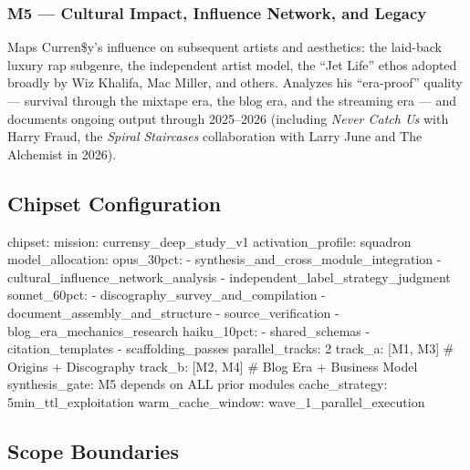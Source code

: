 \documentclass[11pt,letterpaper]{article}
\begin{document}
\subsubsection{M5 — Cultural Impact, Influence Network, and Legacy}
Maps Curren\$y's influence on subsequent artists and aesthetics: the laid-back luxury rap subgenre, the independent artist model, the ``Jet Life'' ethos adopted broadly by Wiz Khalifa, Mac Miller, and others. Analyzes his ``era-proof'' quality — survival through the mixtape era, the blog era, and the streaming era — and documents ongoing output through 2025–2026 (including \textit{Never Catch Us} with Harry Fraud, the \textit{Spiral Staircases} collaboration with Larry June and The Alchemist in 2026).

\subsection{Chipset Configuration}

\begin{center}
\begin{asciibox}
chipset:
  mission: currensy_deep_study_v1
  activation_profile: squadron
  model_allocation:
    opus_30pct:
      - synthesis_and_cross_module_integration
      - cultural_influence_network_analysis
      - independent_label_strategy_judgment
    sonnet_60pct:
      - discography_survey_and_compilation
      - document_assembly_and_structure
      - source_verification
      - blog_era_mechanics_research
    haiku_10pct:
      - shared_schemas
      - citation_templates
      - scaffolding_passes
  parallel_tracks: 2
    track_a: [M1, M3]   # Origins + Discography
    track_b: [M2, M4]   # Blog Era + Business Model
  synthesis_gate: M5 depends on ALL prior modules
  cache_strategy: 5min_ttl_exploitation
    warm_cache_window: wave_1_parallel_execution
\end{asciibox}
\end{center}

\subsection{Scope Boundaries}
\end{document}

